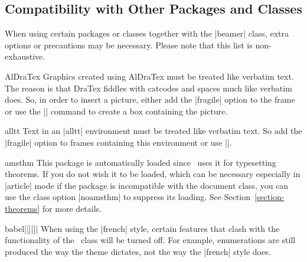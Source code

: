 %
%
%

\subsection{Compatibility with Other Packages and Classes}

When using certain packages or classes together with the |beamer| class, extra options or precautions may be necessary. Please note that this list is non-exhaustive.

\begin{package}{{AlDraTex}}
  Graphics created using AlDraTex must be treated like verbatim text. The reason is that DraTex fiddles with catcodes and spaces much like verbatim does. So, in order to insert a picture, either add the |fragile| option to the frame or use the || command to create a box containing the picture.
\end{package}

\begin{package}{{alltt}}
  Text in an |alltt| environment must be treated like verbatim text. So add the |fragile| option to frames containing this environment or use ||.
\end{package}

\begin{package}{{amsthm}}
  This package is automatically loaded since \beamer\ uses it for typesetting theorems. If you do not wish it to be loaded, which can be necessary especially in |article| mode if the package is incompatible with the document class, you can use the class option |noamsthm| to suppress its loading. See Section~\ref{section-theorems} for more details.
\end{package}

\begin{package}{{babel}|[||]|}
  When using the |french| style, certain features that clash with the functionality of the \beamer\ class will be turned off. For example, enumerations are still produced the way the theme dictates, not the way the |french| style does.
\end{package}


